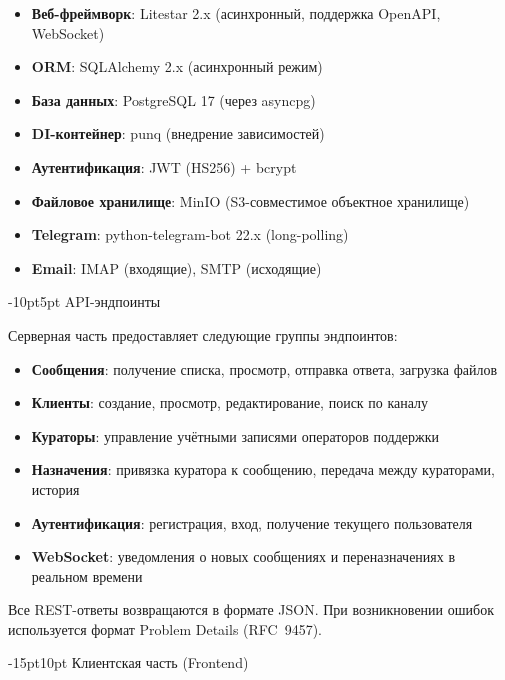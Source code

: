 \documentclass[12pt,a4paper]{report}
\makeatletter
\renewcommand{\section}{%
  \@startsection{section}{1}{\z@}%
  {-15pt}{10pt}%
  {\centering\normalfont\bfseries\large}}
\renewcommand{\subsection}{%
  \@startsection{subsection}{2}{\z@}%
  {-10pt}{5pt}%
  {\normalfont\bfseries\large}}
\makeatother
\begin{document}
\begin{itemize}
    \item \textbf{Веб-фреймворк}: Litestar 2.x (асинхронный, поддержка OpenAPI, WebSocket)
    \item \textbf{ORM}: SQLAlchemy 2.x (асинхронный режим)
    \item \textbf{База данных}: PostgreSQL 17 (через asyncpg)
    \item \textbf{DI-контейнер}: punq (внедрение зависимостей)
    \item \textbf{Аутентификация}: JWT (HS256) + bcrypt
    \item \textbf{Файловое хранилище}: MinIO (S3-совместимое объектное хранилище)
    \item \textbf{Telegram}: python-telegram-bot 22.x (long-polling)
    \item \textbf{Email}: IMAP (входящие), SMTP (исходящие)
\end{itemize}

\subsection{API-эндпоинты}

Серверная часть предоставляет следующие группы эндпоинтов:

\begin{itemize}
    \item \textbf{Сообщения}: получение списка, просмотр, отправка ответа, загрузка файлов
    \item \textbf{Клиенты}: создание, просмотр, редактирование, поиск по каналу
    \item \textbf{Кураторы}: управление учётными записями операторов поддержки
    \item \textbf{Назначения}: привязка куратора к сообщению, передача между кураторами, история
    \item \textbf{Аутентификация}: регистрация, вход, получение текущего пользователя
    \item \textbf{WebSocket}: уведомления о новых сообщениях и переназначениях в реальном времени
\end{itemize}

Все REST-ответы возвращаются в формате JSON. При возникновении ошибок используется формат Problem Details (RFC~9457).

\section{Клиентская часть (Frontend)}
\end{document}
